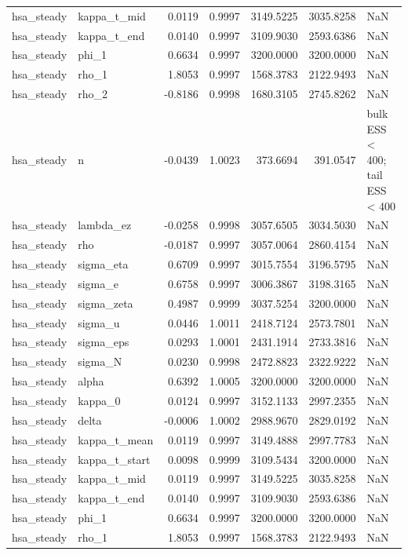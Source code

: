 \begin{tabular}{llrrrrl}
hsa\_steady & kappa\_t\_mid & 0.0119 & 0.9997 & 3149.5225 & 3035.8258 & NaN \\
hsa\_steady & kappa\_t\_end & 0.0140 & 0.9997 & 3109.9030 & 2593.6386 & NaN \\
hsa\_steady & phi\_1 & 0.6634 & 0.9997 & 3200.0000 & 3200.0000 & NaN \\
hsa\_steady & rho\_1 & 1.8053 & 0.9997 & 1568.3783 & 2122.9493 & NaN \\
hsa\_steady & rho\_2 & -0.8186 & 0.9998 & 1680.3105 & 2745.8262 & NaN \\
hsa\_steady & n & -0.0439 & 1.0023 & 373.6694 & 391.0547 & bulk ESS < 400; tail ESS < 400 \\
hsa\_steady & lambda\_ez & -0.0258 & 0.9998 & 3057.6505 & 3034.5030 & NaN \\
hsa\_steady & rho & -0.0187 & 0.9997 & 3057.0064 & 2860.4154 & NaN \\
hsa\_steady & sigma\_eta & 0.6709 & 0.9997 & 3015.7554 & 3196.5795 & NaN \\
hsa\_steady & sigma\_e & 0.6758 & 0.9997 & 3006.3867 & 3198.3165 & NaN \\
hsa\_steady & sigma\_zeta & 0.4987 & 0.9999 & 3037.5254 & 3200.0000 & NaN \\
hsa\_steady & sigma\_u & 0.0446 & 1.0011 & 2418.7124 & 2573.7801 & NaN \\
hsa\_steady & sigma\_eps & 0.0293 & 1.0001 & 2431.1914 & 2733.3816 & NaN \\
hsa\_steady & sigma\_N & 0.0230 & 0.9998 & 2472.8823 & 2322.9222 & NaN \\
hsa\_steady & alpha & 0.6392 & 1.0005 & 3200.0000 & 3200.0000 & NaN \\
hsa\_steady & kappa\_0 & 0.0124 & 0.9997 & 3152.1133 & 2997.2355 & NaN \\
hsa\_steady & delta & -0.0006 & 1.0002 & 2988.9670 & 2829.0192 & NaN \\
hsa\_steady & kappa\_t\_mean & 0.0119 & 0.9997 & 3149.4888 & 2997.7783 & NaN \\
hsa\_steady & kappa\_t\_start & 0.0098 & 0.9999 & 3109.5434 & 3200.0000 & NaN \\
hsa\_steady & kappa\_t\_mid & 0.0119 & 0.9997 & 3149.5225 & 3035.8258 & NaN \\
hsa\_steady & kappa\_t\_end & 0.0140 & 0.9997 & 3109.9030 & 2593.6386 & NaN \\
hsa\_steady & phi\_1 & 0.6634 & 0.9997 & 3200.0000 & 3200.0000 & NaN \\
hsa\_steady & rho\_1 & 1.8053 & 0.9997 & 1568.3783 & 2122.9493 & NaN \\

\end{tabular}
